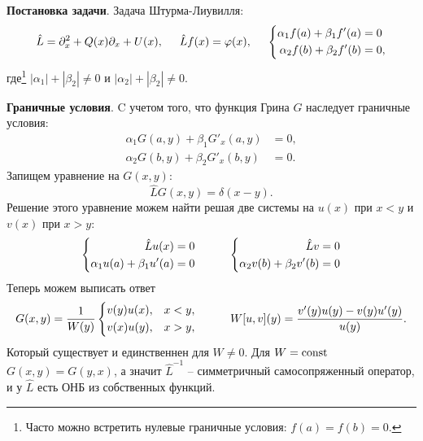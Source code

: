 
\textbf{Постановка задачи}. 
Задача Штурма-Лиувилля:
\begin{equation}
    \hat{L} = \partial_x^2 + Q(x) \partial_x + U(x),
    \hspace{5 mm} 
    \hat{L} f(x) = \varphi(x),
    \hspace{5 mm} 
    \left\{\begin{aligned}
        \alpha_1 f(a) + \beta_1 f'(a) &= 0 \\
        \alpha_2 f(b) + \beta_2 f'(b) &= 0,
    \end{aligned}\right.
\end{equation}
где\footnote{
    Часто можно встретить нулевые граничные условия: $f(a) = f(b) = 0$. 
}  $|\alpha_1| + |\beta_2| \neq 0$ и $|\alpha_2| + |\beta_2| \neq 0$.

\textbf{Граничные условия}.  C учетом того, что функция Грина $G$ наследует граничные условия:
\begin{align*}
    \alpha_1 G(a, y) + \beta_1 G'_x (a, y) &= 0, \\
    \alpha_2 G(b, y) + \beta_2 G'_x (b, y) &= 0.
\end{align*}
Запищем уравнение на $G(x, y)$:
\begin{equation*}
    \hat{L} G(x, y) = \delta(x-y).
\end{equation*}
Решение этого уравнение можем найти решая две системы на $u(x)$ при $x < y$ и $v(x)$ при $x > y$:
\begin{equation*}
\left\{\begin{aligned}
        \hat{L} u(x) &= 0 \\
        \alpha_1 u(a) + \beta_1 u'(a) &= 0
    \end{aligned}\right.
    \hspace{10 mm} 
    \left\{\begin{aligned}
        \hat{L} v &= 0 \\
        \alpha_2 v(b) + \beta_2 v'(b) &= 0
    \end{aligned}\right.
\end{equation*}
Теперь можем выписать ответ
\begin{equation}
    G(x, y) = \frac{1}{W(y)} \left\{\begin{aligned}
        &v(y) u(x), &x < y, \\
        &v(x) u(y), &x > y,
    \end{aligned}\right.
    \hspace{10 mm} 
    W[u, v](y) = \frac{v' (y) u(y) - v(y) u'(y)}{u(y)}.
\end{equation}
Который существует и единственнен для $W \neq 0$. Для $W = \textnormal{const} $ $G(x, y) = G(y, x)$, а значит $\hat{L}^{-1}$ -- симметричный самосопряженный оператор, и у $\hat{L}$ есть ОНБ из собственных функций. 


